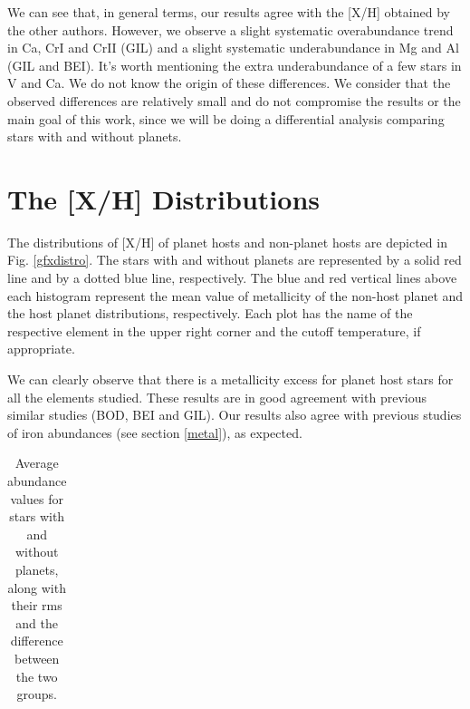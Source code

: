 \documentclass[dvips,12pt,a4paper]{report}
\begin{document}
{{We can see that, in general terms, our results agree with the [X/H] obtained by the other authors. However, we observe a slight systematic overabundance trend in Ca, CrI and CrII (GIL) and a slight systematic underabundance in Mg and Al (GIL and BEI). It's worth mentioning the extra underabundance of a few stars in V and Ca. We do not know the origin of these differences. We consider that the observed differences are relatively small and do not compromise the results or the main goal of this work, since we will be doing a differential analysis comparing stars with and without planets.







\section{The [X/H] Distributions}

The distributions of [X/H] of planet hosts and non-planet hosts are depicted in Fig. \ref{gfxdistro}. The stars with  and without planets are represented by a solid red line and by a dotted blue line, respectively. The blue and red vertical lines above each histogram represent the mean value of metallicity of the non-host planet and the host planet distributions, respectively. Each plot has the name of the respective element in the upper right corner and the cutoff temperature, if appropriate.

We can clearly observe that there is a metallicity excess for planet host stars for all the elements studied. These results are in good agreement with previous similar studies (BOD, BEI and GIL). Our results also agree with previous studies of iron abundances (see section \ref{metal}), as expected.

\begin{table}[h!]\scriptsize
\label {avgabund}
\centering
\caption[Average abundances for stars with and without planets ]{Average abundance values for stars with and without planets, along with their rms and the difference between the two groups.}
\begin{tabular}{ l c c c c c}


\end{tabular}
\end{table}}}
\end{document}
